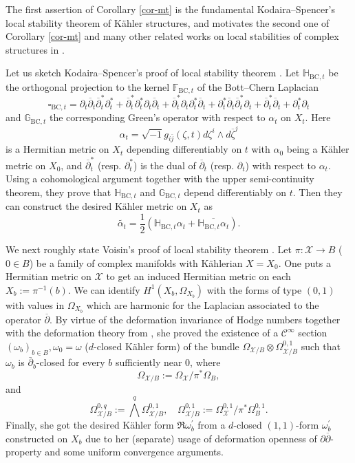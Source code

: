 \documentclass[12pt]{amsart}
\numberwithin{equation}{section}
\theoremstyle{definition}
\theoremstyle{definition}
\theoremstyle{definition}
\newcommand{\w}{\wedge}
\renewcommand{\1}{\mathsf{1}}
\newcommand{\G}{\mathbb{G}}
\newcommand{\db}{\overline{\partial}}
\renewcommand{\>}{\rightarrow}
\newcommand{\p}{\partial}
\newcommand{\bp}{\overline\partial}
\def\p{\partial}
\def\mb{\mathbb}
\def\mc{\mathcal}
\def\w{\wedge}
\theoremstyle{plain} %
\theoremstyle{plain} %
\theoremstyle{plain} %
\begin{document}
	The first assertion of Corollary \ref{cor-mt} is the fundamental Kodaira--Spencer's local stability theorem of K\"ahler structures, and motivates the second one of Corollary \ref{cor-mt} and many other related works on local stabilities of
	complex structures in \cite{FY11,Vo02,Wu06,AU16,AU17,RWZ19}.
	
	
	

	
	Let us sketch Kodaira--Spencer's proof of local stability theorem
	\cite{KS60}. Let $\mathbb H_{\mathrm {BC},t}$ be the orthogonal projection to the kernel
	$\mathds{F}_{\mathrm {BC},t}$ of the Bott--Chern Laplacian
	\begin{equation*}
		\square_{{\mathrm {BC}},t}=\p_t\db_t\db_t^*\p_t^*+\db_t^*\p_t^*\p_t\db_t+\db_t^*\p_t\p_t^*\db_t+\p_t^*\db_t\db_t^*\p_t+\db_t^*\db_t+\p_t^*\p_t
	\end{equation*}
	and $\G_{\mathrm {BC},t}$ the corresponding Green's operator with respect to $\alpha_t$ on $X_t$.
	Here
	$$\alpha_t=\sqrt{-1}g_{i\overline{ j}}(\zeta,t)d \zeta^i \w d \overline{\zeta}^j$$
	is a Hermitian metric on $X_t$ depending differentiably on $t$ with $\alpha_0$ being a K\"ahler metric on $X_0$,
	and $\db_t^*$ (resp.  $\p_t^*$) is the dual of $\db_t$ (resp. $\p_t$) with respect to $\alpha_t$. Using a cohomological argument together with  the upper semi-continuity theorem, they prove that
	$\mathbb H_{\mathrm {BC},t}$ and $\G_{\mathrm {BC},t}$ depend differentiably on $t$. Then they can
	construct the desired K\"ahler metric on $X_t$ as
	$$\widetilde{\alpha_t}=\frac{1}{2}(\mb H_{\mathrm {BC},t}\alpha_t+\overline{\mb H_{\mathrm {BC},t}\alpha_t}).$$
	
	
	
	
	We next roughly state  Voisin's proof of local stability theorem \cite[Theorem 9.23]{Vo02}. Let $\pi: \mathcal{X} \rightarrow B$ ($0 \in B$) be a family of complex manifolds with K\"ahlerian $X=X_0$. One  puts a Hermitian metric on $\mathcal{X}$ to get  an induced Hermitian metric on each $X_{b}:=\pi^{-1}(b)$. We can identify $H^{1}\left(X_{b}, \Omega_{X_{b}}\right)$  with the forms of type $(0,1)$ with values in $\Omega_{X_{b}}$ which are harmonic for the Laplacian associated to the operator $\bp$.  By virtue of the deformation invariance of Hodge numbers \cite[Proposition 9.20]{Vo02} together with the deformation theory from \cite{MK71}, she proved the existence of a $\mathcal{C}^{\infty}$ section $\left(\omega_{b}\right)_{b \in B}, \omega_{0}=\omega$ ($d$-closed K\"ahler form) of the bundle $\Omega_{\mathcal{X} / B} \otimes \Omega_{\mathcal{X} / B}^{0,1}$ such that $\omega_{b}$ is $\bar{\partial}_b$-closed for every $b$ sufficiently near 0, where
	$$ \Omega_{\mathcal{X} / B}:=\Omega_{\mathcal{X}} / \pi^{*} \Omega_{B},$$
	and
	$$\Omega_{\mc X/B} ^{0,q}:=\bigwedge ^q\Omega_{\mathcal{X} / B}^{0,1},\quad \Omega_{\mathcal{X} / B}^{0,1}:=\Omega_\mc X^{0,1}/\pi^*\Omega_B^{0,1}.$$
	Finally, she got the desired K\"ahler form $\Re \omega_{b}^{\prime}$ from a $d$-closed $(1,1)$-form $\omega_{b}^{\prime}$ constructed on $X_b$ due to her (separate) usage of deformation openness of $\p\bp$-property \cite[Propositions 9.20, 9.21]{Vo02} and some uniform convergence arguments. 
    
\end{document}
